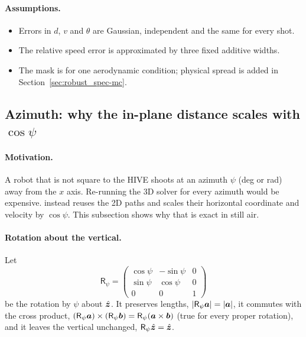 \paragraph{Assumptions.}
\begin{itemize}
  \item Errors in $d$, $v$ and $\theta$ are Gaussian, independent and the same for every shot.
  \item The relative speed error is approximated by three fixed additive widths.
  \item The mask is for one aerodynamic condition; physical spread is added in Section~\ref{sec:robust_spec-mc}.
\end{itemize}

\subsection{Azimuth: why the in-plane distance scales with $\cos\psi$}
\label{sec:robust_spec-azimuth}

\paragraph{Motivation.}
A robot that is not square to the HIVE shoots at an azimuth $\psi$ (\unit{deg} or \unit{rad}) away
from the $x$ axis.
Re-running the 3D solver for every azimuth would be expensive.
 instead reuses the 2D paths and scales their horizontal coordinate and velocity
by $\cos\psi$.
This subsection shows why that is exact in still air.

\paragraph{Rotation about the vertical.}
Let
\begin{equation}
  \mathsf R_\psi = \begin{pmatrix}\cos\psi & -\sin\psi & 0\\ \sin\psi & \cos\psi & 0\\ 0&0&1\end{pmatrix}
  \label{eq:robust_spec-Rz}
\end{equation}
be the rotation by $\psi$ about $\hat{\bm{z}}$.
It preserves lengths, $|\mathsf R_\psi\bm{a}| = |\bm{a}|$, it commutes with the cross product,
$(\mathsf R_\psi\bm{a})\times(\mathsf R_\psi\bm{b}) = \mathsf R_\psi(\bm{a}\times\bm{b})$ (true for
every proper rotation), and it leaves the vertical unchanged, $\mathsf R_\psi\hat{\bm{z}}=\hat{\bm{z}}$.

